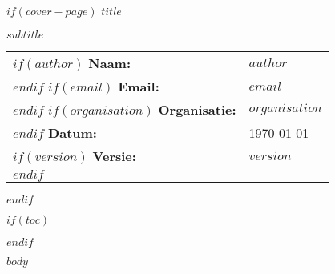 \documentclass[11pt, a4paper]{article}
\begin{document}
    \raggedright %

    $if(cover-page)$
        \thispagestyle{empty} %
        \vspace*{\fill}
        {\Huge\bfseries\color{accentcolor}\MakeUppercase{$title$}}  %

        {\Large\bfseries\MakeUppercase{$subtitle$}}  %
        \vspace*{4em}

        \begin{tabular}{ll}
            $if(author)$
                \textbf{Naam:} & $author$ \\
            $endif$
            $if(email)$
                \textbf{Email:} & $email$ \\
            $endif$
            $if(organisation)$
                \textbf{Organisatie:} & $organisation$ \\
            $endif$
            \textbf{Datum:} & \today \\
            $if(version)$
                \textbf{Versie:} & $version$ \\
            $endif$
        \end{tabular}

    $endif$

    $if(toc)$
        \thispagestyle{empty}
        \begin{spacing}{1.2} %
            \setlength{\parskip}{0pt} %
            \setcounter{tocdepth}{$toc-depth$}
            \thispagestyle{empty} %
            \tableofcontents
            \newpage
        \end{spacing} %
    $endif$

    $body$
\end{document}
